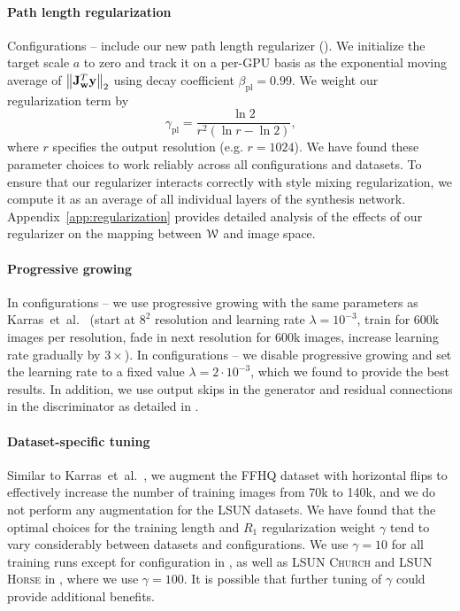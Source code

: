 \paragraph{Path length regularization}
Configurations -- include our new path length regularizer ().
We initialize the target scale $a$ to zero and track it on a per-GPU basis as the exponential moving average of $\left\lVert \mathbf{J}_{{\bf w}}^T {\bf y}\right\rVert_2$ using decay coefficient $\beta_\mathrm{pl} = 0.99$.
We weight our regularization term by
\begin{equation}
\gamma_\textrm{pl} = \frac{\ln 2}{r^2 (\ln r - \ln 2)}
\textrm{,}
\end{equation}
where $r$ specifies the output resolution (e.g. $r=1024$).
We have found these parameter choices to work reliably across all configurations and datasets.
To ensure that our regularizer interacts correctly with style mixing regularization, we compute it as an average of all individual layers of the synthesis network. %
Appendix~\ref{app:regularization} provides detailed analysis of the effects of our regularizer on the mapping between $\mathcal{W}$ and image space.

\paragraph{Progressive growing}
In configurations -- we use progressive growing with the same parameters as Karras~et~al.~\cite{Karras2018} (start at $8^2$ resolution and learning rate $\lambda = 10^{-3}$, train for 600k images per resolution, fade in next resolution for 600k images, increase learning rate gradually by $3\times$).
In configurations -- we disable progressive growing and set the learning rate to a fixed value $\lambda = 2 \cdot 10^{-3}$, which we found to provide the best results.
In addition, we use output skips in the generator and residual connections in the discriminator as detailed in .

\paragraph{Dataset-specific tuning}
Similar to Karras~et~al.~\cite{Karras2018}, we augment the \textsc{FFHQ} dataset with horizontal flips to effectively increase the number of training images from 70k to 140k, and we do not perform any augmentation for the \textsc{LSUN} datasets.
We have found that the optimal choices for the training length and $R_1$ regularization weight $\gamma$ tend to vary considerably between datasets and configurations.
We use $\gamma = 10$ for all training runs except for configuration  in , as well as \textsc{LSUN Church} and \textsc{LSUN Horse} in , where we use $\gamma = 100$.
It is possible that further tuning of $\gamma$ could provide additional benefits.

